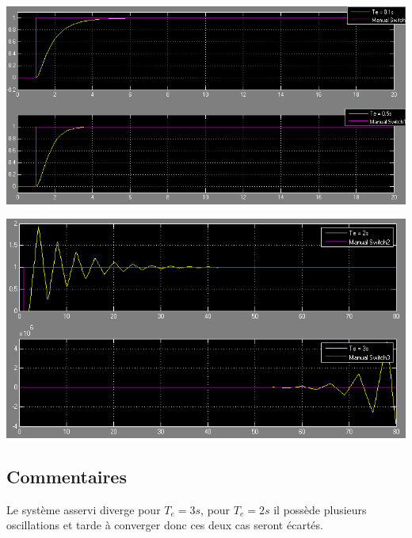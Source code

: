 	\begin{center}
	\includegraphics[scale=0.4]{simu11.png}
	\label{fig9} 
	\end{center}
	
	\begin{center}
	\includegraphics[scale=0.5]{simu22.png}
	\label{fig10} 
	\end{center}

\subsection{Commentaires}

\par Le système asservi diverge pour $T_e = 3 s$,  pour $T_e = 2 s$ il possède plusieurs oscillations et tarde à converger donc ces deux cas seront écartés.\\

   	

